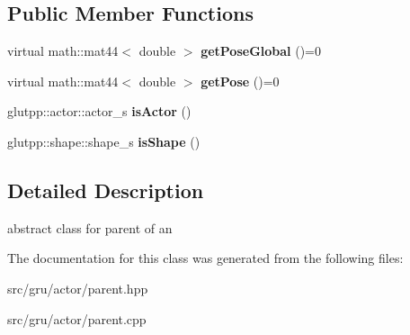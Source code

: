 \subsection*{\-Public \-Member \-Functions}
\begin{DoxyCompactItemize}
\item 
\hypertarget{classglutpp_1_1actor_1_1parent_ab068cbe871896c5554096dffbd15e304}{virtual math\-::mat44$<$ double $>$ {\bfseries get\-Pose\-Global} ()=0}\label{classglutpp_1_1actor_1_1parent_ab068cbe871896c5554096dffbd15e304}

\item 
\hypertarget{classglutpp_1_1actor_1_1parent_af748af3f0a3291109fb9b3fc0b9b71c7}{virtual math\-::mat44$<$ double $>$ {\bfseries get\-Pose} ()=0}\label{classglutpp_1_1actor_1_1parent_af748af3f0a3291109fb9b3fc0b9b71c7}

\item 
\hypertarget{classglutpp_1_1actor_1_1parent_a46d5c9edf657c619a5245d231de5fac1}{glutpp\-::actor\-::actor\-\_\-s {\bfseries is\-Actor} ()}\label{classglutpp_1_1actor_1_1parent_a46d5c9edf657c619a5245d231de5fac1}

\item 
\hypertarget{classglutpp_1_1actor_1_1parent_a879dd673ee1a887efa2ad4175d61ba14}{glutpp\-::shape\-::shape\-\_\-s {\bfseries is\-Shape} ()}\label{classglutpp_1_1actor_1_1parent_a879dd673ee1a887efa2ad4175d61ba14}

\end{DoxyCompactItemize}


\subsection{\-Detailed \-Description}
abstract class for parent of an  

\-The documentation for this class was generated from the following files\-:\begin{DoxyCompactItemize}
\item 
src/gru/actor/parent.\-hpp\item 
src/gru/actor/parent.\-cpp\end{DoxyCompactItemize}
